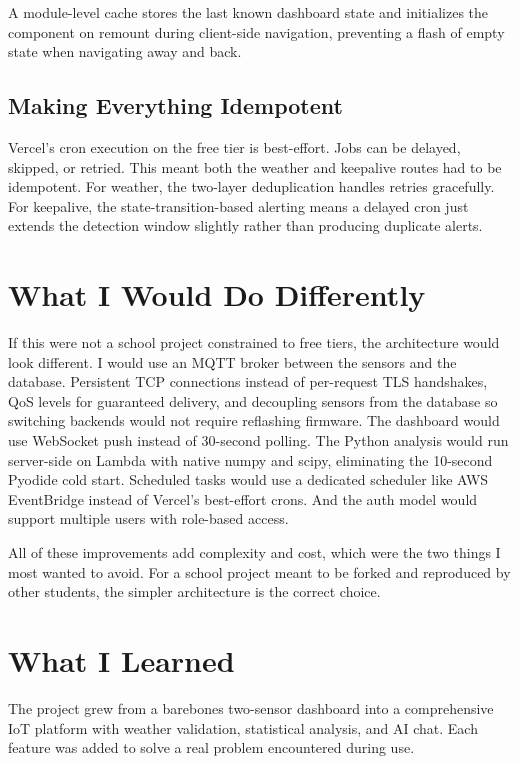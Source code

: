 \documentclass[11pt, letterpaper]{article}
\begin{document}
A module-level cache stores the last known dashboard state and initializes the component on remount during client-side navigation, preventing a flash of empty state when navigating away and back.

\subsection{Making Everything Idempotent}

Vercel's cron execution on the free tier is best-effort. Jobs can be delayed, skipped, or retried. This meant both the weather and keepalive routes had to be idempotent. For weather, the two-layer deduplication handles retries gracefully. For keepalive, the state-transition-based alerting means a delayed cron just extends the detection window slightly rather than producing duplicate alerts.


\section{What I Would Do Differently}

If this were not a school project constrained to free tiers, the architecture would look different. I would use an MQTT broker between the sensors and the database. Persistent TCP connections instead of per-request TLS handshakes, QoS levels for guaranteed delivery, and decoupling sensors from the database so switching backends would not require reflashing firmware. The dashboard would use WebSocket push instead of 30-second polling. The Python analysis would run server-side on Lambda with native numpy and scipy, eliminating the 10-second Pyodide cold start. Scheduled tasks would use a dedicated scheduler like AWS EventBridge instead of Vercel's best-effort crons. And the auth model would support multiple users with role-based access.

All of these improvements add complexity and cost, which were the two things I most wanted to avoid. For a school project meant to be forked and reproduced by other students, the simpler architecture is the correct choice.


\section{What I Learned}

The project grew from a barebones two-sensor dashboard into a comprehensive IoT platform with weather validation, statistical analysis, and AI chat. Each feature was added to solve a real problem encountered during use.
\end{document}
